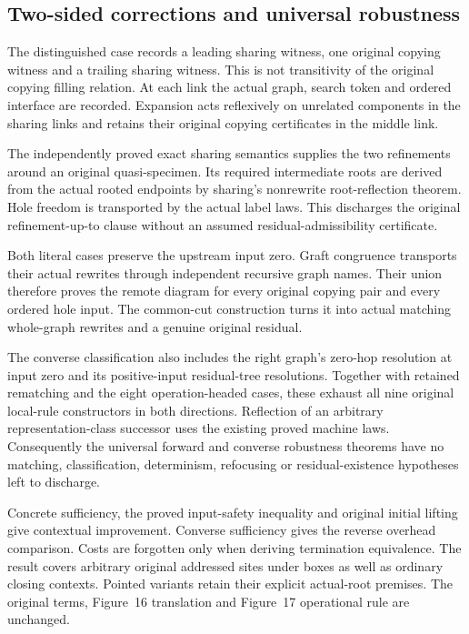 \subsection{Two-sided corrections and universal robustness}
The distinguished case records a leading sharing witness, one original
copying witness and a trailing sharing witness. This is not transitivity
of the original copying filling relation. At each link the actual graph,
search token and ordered interface are recorded. Expansion acts reflexively
on unrelated components in the sharing links and retains their original
copying certificates in the middle link.

The independently proved exact sharing semantics supplies the two
refinements around an original quasi-specimen. Its required intermediate
roots are derived from the actual rooted endpoints by sharing's nonrewrite
root-reflection theorem. Hole freedom is transported by the actual label
laws. This discharges the original refinement-up-to clause without an
assumed residual-admissibility certificate.

Both literal cases preserve the upstream input zero. Graft congruence
transports their actual rewrites through independent recursive graph names.
Their union therefore proves the remote diagram for every original copying
pair and every ordered hole input. The common-cut construction turns it into
actual matching whole-graph rewrites and a genuine original residual.

The converse classification also includes the right graph's zero-hop
resolution at input zero and its positive-input residual-tree resolutions.
Together with retained rematching and the eight operation-headed cases,
these exhaust all nine original local-rule constructors in both directions.
Reflection of an arbitrary representation-class successor uses the existing
proved machine laws. Consequently the universal forward and converse
robustness theorems have no matching, classification, determinism,
refocusing or residual-existence hypotheses left to discharge.

Concrete sufficiency, the proved input-safety inequality and original initial
lifting give contextual improvement. Converse sufficiency gives the reverse
overhead comparison. Costs are forgotten only when deriving termination
equivalence. The result covers arbitrary original addressed sites under
boxes as well as ordinary closing contexts. Pointed variants retain their
explicit actual-root premises. The original terms, Figure~16 translation
and Figure~17 operational rule are unchanged.


